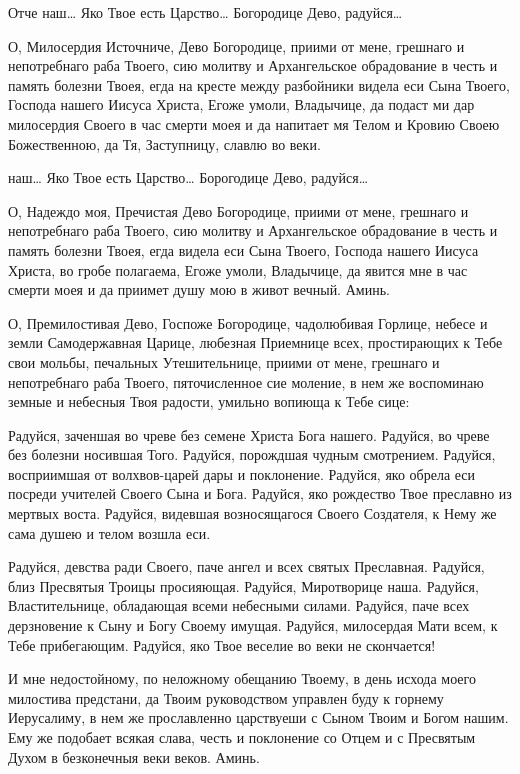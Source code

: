 \begin{mymulticols}

Отче наш… Яко Твое есть Царство… Богородице Дево, радуйся…

О, Милосердия Источниче, Дево Богородице, приими от мене, грешнаго и непотребнаго раба Твоего, сию молитву и Архангельское обрадование в честь и память болезни Твоея, егда на кресте между разбойники видела еси Сына Твоего, Господа нашего Иисуса Христа, Егоже умоли, Владычице, да подаст ми дар милосердия Своего в час смерти моея и да напитает мя Телом и Кровию Своею Божественною, да Тя, Заступницу, славлю во веки.


{ наш… Яко Твое есть Царство… Борогодице Дево, радуйся…

О, Надеждо моя, Пречистая Дево Богородице, приими от мене, грешнаго и непотребнаго раба Твоего, сию молитву и Архангельское обрадование в честь и память болезни Твоея, егда видела еси Сына Твоего, Господа нашего Иисуса Христа, во гробе полагаема, Егоже умоли, Владычице, да явится мне в час смерти моея и да приимет душу мою в живот вечный. Аминь.

О, Премилостивая Дево, Госпоже Богородице, чадолюбивая Горлице, небесе и земли Самодержавная Царице, любезная Приемнице всех, простирающих к Тебе свои мольбы, печальных Утешительнице, приими от мене, грешнаго и непотребнаго раба Твоего, пяточисленное сие моление, в нем же воспоминаю земные и небесныя Твоя радости, умильно вопиюща к Тебе сице:

 Радуйся, заченшая во чреве без семене Христа Бога нашего. Радуйся, во чреве без болезни носившая Того. Радуйся, порождшая чудным смотрением. Радуйся, восприимшая от волхвов-царей дары и поклонение. Радуйся, яко обрела еси посреди учителей Своего Сына и Бога. Радуйся, яко рождество Твое преславно из мертвых воста. Радуйся, видевшая возносящагося Своего Создателя, к Нему же сама душею и телом возшла еси.

 Радуйся, девства ради Своего, паче ангел и всех святых Преславная. Радуйся, близ Пресвятыя Троицы просияющая. Радуйся, Миротворице наша. Радуйся, Властительнице, обладающая всеми небесными силами. Радуйся, паче всех дерзновение к Сыну и Богу Своему имущая. Радуйся, милосердая Мати всем, к Тебе прибегающим. Радуйся, яко Твое веселие во веки не скончается!

И мне недостойному, по неложному обещанию Твоему, в день исхода моего милостива предстани, да Твоим руководством управлен буду к горнему Иерусалиму, в нем же прославленно царствуеши с Сыном Твоим и Богом нашим. Ему же подобает всякая слава, честь и поклонение со Отцем и с Пресвятым Духом в безконечныя веки веков. Аминь.

}
\end{mymulticols}
